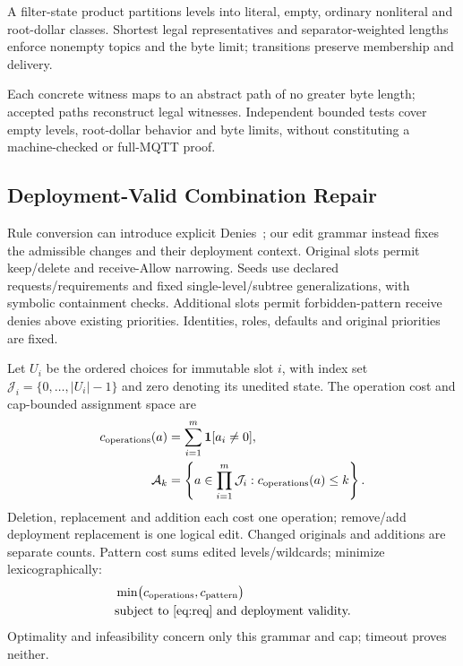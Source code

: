\documentclass[letterpaper,journal]{IEEEtran}
\begin{document}
A filter-state product partitions levels into literal, empty, ordinary nonliteral and root-dollar classes. Shortest legal representatives and separator-weighted lengths enforce nonempty topics and the byte limit; transitions preserve membership and delivery.

Each concrete witness maps to an abstract path of no greater byte length; accepted paths reconstruct legal witnesses. Independent bounded tests cover empty levels, root-dollar behavior and byte limits, without constituting a machine-checked or full-MQTT proof.

\subsection{Deployment-Valid Combination Repair}
Rule conversion can introduce explicit Denies~\cite{deny_conversion}; our edit grammar instead fixes the admissible changes and their deployment context. Original slots permit keep/delete and receive-Allow narrowing. Seeds use declared requests/requirements and fixed single-level/subtree generalizations, with symbolic containment checks. Additional slots permit forbidden-pattern receive denies above existing priorities. Identities, roles, defaults and original priorities are fixed.

Let $U_i$ be the ordered choices for immutable slot $i$, with index set $\mathcal J_i=\{0,\ldots,|U_i|-1\}$ and zero denoting its unedited state. The operation cost and cap-bounded assignment space are
\begin{equation}\label{eq:assignments}\begin{aligned}
 c_{\rm operations}(a)&=\sum_{i=1}^{m}\mathbf{1}[a_i\ne0],\\
 \mathcal A_k&=\left\{a\in\prod_{i=1}^{m}\mathcal J_i:c_{\rm operations}(a)\le k\right\}.
\end{aligned}\end{equation}
Deletion, replacement and addition each cost one operation; remove/add deployment replacement is one logical edit. Changed originals and additions are separate counts. Pattern cost sums edited levels/wildcards; minimize lexicographically:
\begin{equation}\begin{aligned}
 &\min\bigl(c_{\rm operations},c_{\rm pattern}\bigr)\\
 &\text{subject to~\eqref{eq:req} and deployment validity.}
\end{aligned}\end{equation}
Optimality and infeasibility concern only this grammar and cap; timeout proves neither.
\end{document}
